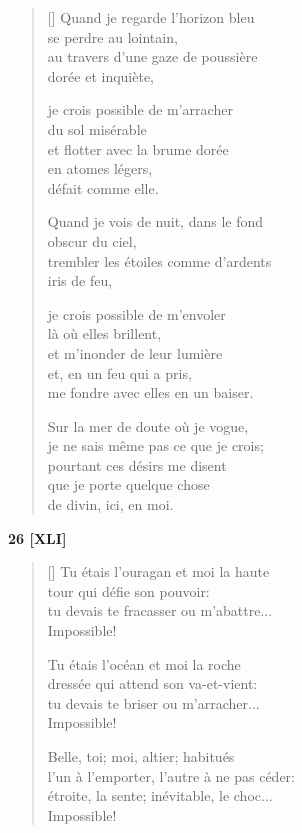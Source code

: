 \documentclass[a4paper,12pt]{book}
\begin{document}
\begin{verse}[\versewidth]
  Quand je regarde l'horizon bleu \\
  se perdre au lointain, \\
  au travers d'une gaze de poussière \\
  dorée et inquiète,

  je crois possible de m'arracher \\
  du sol misérable \\
  et flotter avec la brume dorée \\
  en atomes légers, \\
  défait comme elle.

  Quand je vois de nuit, dans le fond \\
  obscur du ciel, \\
  trembler les étoiles comme d'ardents \\
  iris de feu,

  je crois possible de m'envoler \\
  là où elles brillent, \\
  et m'inonder de leur lumière \\
  et, en un feu qui a pris, \\
  me fondre avec elles en un baiser.

  Sur la mer de doute où je vogue, \\
  je ne sais même pas ce que je crois; \\
  pourtant ces désirs me disent \\
  que je porte quelque chose \\
  de divin, ici, en moi.
\end{verse}

\bigskip

\begin{center}
  \textbf{26 [XLI]}
\end{center}

\settowidth{\versewidth}{l'un à l'emporter, l'autre à ne pas céder;}

\begin{verse}[\versewidth]
  Tu étais l'ouragan et moi la haute \\
  tour qui défie son pouvoir: \\
  tu devais te fracasser ou m'abattre... \\
  Impossible!

  Tu étais l'océan et moi la roche \\
  dressée qui attend son va-et-vient: \\
  tu devais te briser ou m'arracher... \\
  Impossible!

  Belle, toi; moi, altier; habitués \\
  l'un à l'emporter, l'autre à ne pas céder: \\
  étroite, la sente; inévitable, le choc... \\
  Impossible!
\end{verse}
\end{document}
